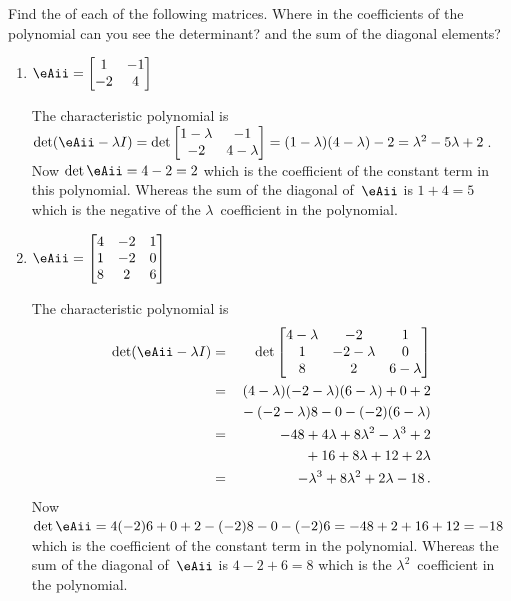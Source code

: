 \begin{example} \label{eg:}
Find the  of each of the following matrices.  
Where in the coefficients of the polynomial can you see the determinant? and the sum of the diagonal elements?
\begin{enumerate}
\item \(\eAii=\begin{bmatrix} 1&-1\\-2&4 \end{bmatrix}\)
\begin{solution} 
The characteristic polynomial is \(\det(\eAii-\lambda I)
=\det\begin{bmatrix} 1-\lambda&-1\\-2&4-\lambda \end{bmatrix}
=(1-\lambda)(4-\lambda)-2
=\lambda^2-5\lambda+2\)\,.
Now \(\det \eAii=4-2=2\) which is the coefficient of the constant term in this polynomial.
Whereas the sum of the diagonal of~\(\eAii\) is \(1+4=5\) which is the negative of the \(\lambda\)~coefficient in the polynomial.
\end{solution}

\item \(\eAii=\begin{bmatrix}4&-2&1
\\1&-2&0
\\8&2&6 \end{bmatrix}\)
\begin{solution} 
The characteristic polynomial is 
\begin{eqnarray*}
\det(\eAii-\lambda I)
&=&\det\begin{bmatrix} 4-\lambda&-2&1
\\1&-2-\lambda&0
\\8&2&6-\lambda \end{bmatrix}
\\&=&(4-\lambda)(-2-\lambda)(6-\lambda)+0+2
\\&&{}
-(-2-\lambda)8-0-(-2)(6-\lambda)
\\&=&-48+4\lambda+8\lambda^2-\lambda^3+2
\\&&{}
+16+8\lambda+12+2\lambda
\\&=&-\lambda^3+8\lambda^2+2\lambda-18\,.
\end{eqnarray*}
Now \(\det \eAii=4(-2)6+0+2-(-2)8-0-(-2)6=-48+2+16+12=-18\) which is the coefficient of the constant term in the polynomial.
Whereas the sum of the diagonal of~\(\eAii\) is \(4-2+6=8\) which is the \(\lambda^2\)~coefficient in the polynomial.
\end{solution}

\end{enumerate}
\end{example}




